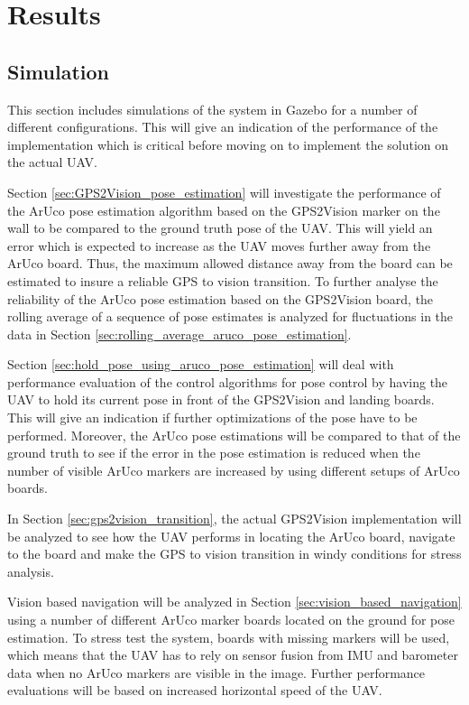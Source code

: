\documentclass[../Head/report.tex]{subfiles}
\begin{document}
\section{Results}
\label{sec:results}

\subsection{Simulation}

This section includes simulations of the system in Gazebo for a number of different configurations. This will give an indication of the performance of the implementation which is critical before moving on to implement the solution on the actual UAV. 

Section \ref{sec:GPS2Vision_pose_estimation} will investigate the performance of the ArUco pose estimation algorithm based on the GPS2Vision marker on the wall to be compared to the ground truth pose of the UAV. This will yield an error which is expected to increase as the UAV moves further away from the ArUco board. Thus, the maximum allowed distance away from the board can be estimated to insure a reliable GPS to vision transition. To further analyse the reliability of the ArUco pose estimation based on the GPS2Vision board, the rolling average of a sequence of pose estimates is analyzed for fluctuations in the data in Section \ref{sec:rolling_average_aruco_pose_estimation}. 

Section \ref{sec:hold_pose_using_aruco_pose_estimation} will deal with performance evaluation of the control algorithms for pose control by having the UAV to hold its current pose in front of the GPS2Vision and landing boards. This will give an indication if further optimizations of the pose have to be performed. Moreover, the ArUco pose estimations will be compared to that of the ground truth to see if the error in the pose estimation is reduced when the number of visible ArUco markers are increased by using different setups of ArUco boards. 

In Section \ref{sec:gps2vision_transition}, the actual GPS2Vision implementation will be analyzed to see how the UAV performs in locating the ArUco board, navigate to the board and make the GPS to vision transition in windy conditions for stress analysis. 

Vision based navigation will be analyzed in Section \ref{sec:vision_based_navigation} using a number of different ArUco marker boards located on the ground for pose estimation. To stress test the system, boards with missing markers will be used, which means that the UAV has to rely on sensor fusion from IMU and barometer data when no ArUco markers are visible in the image. Further performance evaluations will be based on increased horizontal speed of the UAV. 
\end{document}
